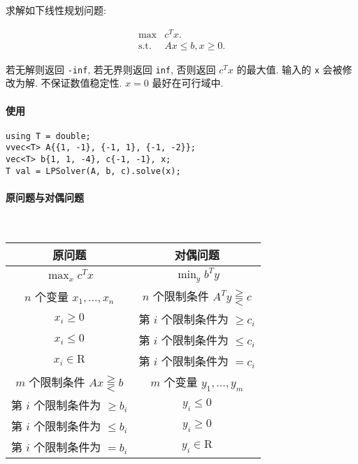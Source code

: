 求解如下线性规划问题:

\[
    \begin{array}{ll}
        \max          & c^T x.             \\
        \textrm{s.t.} & Ax \le b, x \ge 0.
    \end{array}
\]

若无解则返回 \verb|-inf|, 若无界则返回 \verb|inf|, 否则返回 \(c^T x\) 的最大值. 输入的 \verb|x| 会被修改为解. 不保证数值稳定性. \(x = 0\) 最好在可行域中.

\paragraph{使用}

\begin{verbatim}
using T = double;
vvec<T> A{{1, -1}, {-1, 1}, {-1, -2}};
vec<T> b{1, 1, -4}, c{-1, -1}, x;
T val = LPSolver(A, b, c).solve(x);
\end{verbatim}

\paragraph{原问题与对偶问题}~\\

\begin{tabular}{c|c}
    \hline
    原问题                             & 对偶问题                               \\
    \hline
    \(\max_x c^T x\)                & \(\min_y b^T y\)                   \\
    \hline
    \(n\) 个变量 \(x_1,\dots,x_n\)     & \(n\) 个限制条件 \(A^T y\gtreqqless c\) \\
    \(x_i\geq 0\)                   & 第 \(i\) 个限制条件为 \(\geq c_i\)        \\
    \(x_i\leq 0\)                   & 第 \(i\) 个限制条件为 \(\leq c_i\)        \\
    \(x_i\in \mathrm{R}\)           & 第 \(i\) 个限制条件为 \(=c_i\)            \\
    \hline
    \(m\) 个限制条件 \(Ax\gtreqqless b\) & \(m\) 个变量 \(y_1,\dots,y_m\)        \\
    第 \(i\) 个限制条件为 \(\geq b_i\)     & \(y_i\leq 0\)                      \\
    第 \(i\) 个限制条件为 \(\leq b_i\)     & \(y_i\geq 0\)                      \\
    第 \(i\) 个限制条件为 \(=b_i\)         & \(y_i\in \mathrm{R}\)              \\
    \hline
\end{tabular}

